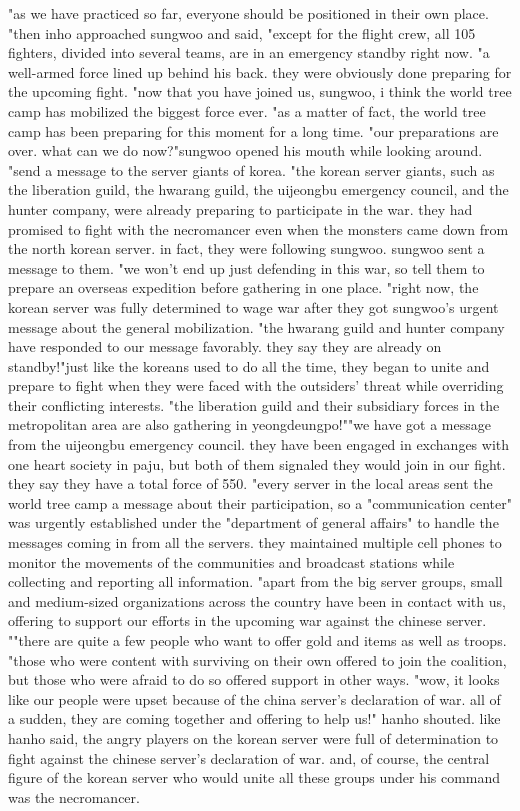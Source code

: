 "as we have practiced so far, everyone should be positioned in their own place.
"then inho approached sungwoo and said, "except for the flight crew, all 105 fighters, divided into several teams, are in an emergency standby right now.
"a well-armed force lined up behind his back.
 they were obviously done preparing for the upcoming fight.
"now that you have joined us, sungwoo, i think the world tree camp has mobilized the biggest force ever.
"as a matter of fact, the world tree camp has been preparing for this moment for a long time.
"our preparations are over.
 what can we do now?"sungwoo opened his mouth while looking around.
"send a message to the server giants of korea.
"the korean server giants, such as the liberation guild, the hwarang guild, the uijeongbu emergency council, and the hunter company, were already preparing to participate in the war.
they had promised to fight with the necromancer even when the monsters came down from the north korean server.
 in fact, they were following sungwoo.
sungwoo sent a message to them.
"we won't end up just defending in this war, so tell them to prepare an overseas expedition before gathering in one place.
"right now, the korean server was fully determined to wage war after they got sungwoo's urgent message about the general mobilization.
"the hwarang guild and hunter company have responded to our message favorably.
 they say they are already on standby!"just like the koreans used to do all the time, they began to unite and prepare to fight when they were faced with the outsiders' threat while overriding their conflicting interests.
"the liberation guild and their subsidiary forces in the metropolitan area are also gathering in yeongdeungpo!""we have got a message from the uijeongbu emergency council.
 they have been engaged in exchanges with one heart society in paju, but both of them signaled they would join in our fight.
 they say they have a total force of 550.
"every server in the local areas sent the world tree camp a message about their participation, so a "communication center" was urgently established under the "department of general affairs" to handle the messages coming in from all the servers.
 they maintained multiple cell phones to monitor the movements of the communities and broadcast stations while collecting and reporting all information.
"apart from the big server groups, small and medium-sized organizations across the country have been in contact with us, offering to support our efforts in the upcoming war against the chinese server.
""there are quite a few people who want to offer gold and items as well as troops.
"those who were content with surviving on their own offered to join the coalition, but those who were afraid to do so offered support in other ways.
"wow, it looks like our people were upset because of the china server's declaration of war.
 all of a sudden, they are coming together and offering to help us!" hanho shouted.
 like hanho said, the angry players on the korean server were full of determination to fight against the chinese server's declaration of war.
and, of course, the central figure of the korean server who would unite all these groups under his command was the necromancer.
 

